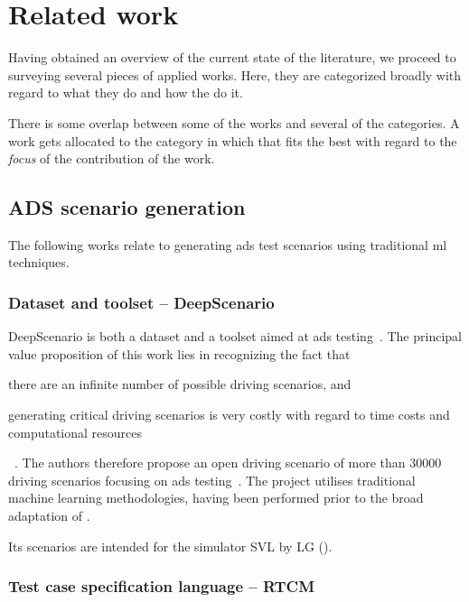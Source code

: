 \section{Related work}\label{sec:relatedWork}

Having obtained an overview of the current state of the literature, we proceed to surveying several
pieces of applied works. Here, they are categorized broadly with regard to what they do and how the
do it.

There is some overlap between some of the works and several of the categories. A work gets allocated
to the category in which that fits the best with regard to the \emph{focus} of the contribution of the work.

\subsection{ADS scenario generation}

The following works relate to generating \acrshort{ads} test scenarios using traditional
\acrshort{ml} techniques.

\subsubsection{Dataset and toolset -- DeepScenario}\label{sec:deepScenario}

DeepScenario is both a dataset and a toolset aimed at \acrlong{ads} testing~\cite{DeepScenario}. The
principal value proposition of this work lies in recognizing the fact that \begin{inparaenum}
    \item there are an infinite number of possible driving scenarios, and
    \item generating critical driving scenarios is very costly with regard to time costs and
    computational resources\end{inparaenum}~\cite[52]{DeepScenario}. The authors therefore propose
an open driving scenario of more than \num{30000} driving scenarios focusing on \acrshort{ads}
testing~\cite[52]{DeepScenario}. The project utilises traditional machine learning
methodologies, having been performed prior to the broad adaptation of .

Its scenarios are intended for the simulator SVL by LG ().

\subsubsection{Test case specification language -- RTCM}


